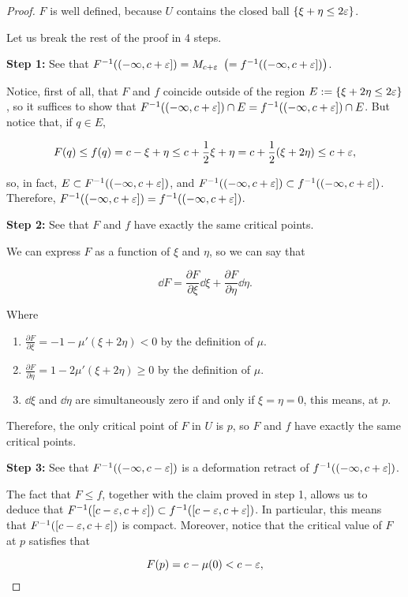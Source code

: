 \begin{proof}
$F$ is well defined, because $U$ contains the closed ball $\{ \xi + \eta \leq 2\varepsilon \}$.

Let us break the rest of the proof in 4 steps.

{\bf Step 1:} See that $F^{-1}((-\infty,c+\varepsilon]) = M_{c+\varepsilon} \ \left( = f^{-1}((-\infty,c+\varepsilon]) \right)$.

Notice, first of all, that $F$ and $f$ coincide outside of the region $E:=\{ \xi + 2\eta \leq 2\varepsilon\}$, so it suffices to show that $F^{-1}((-\infty,c+\varepsilon]) \cap E = f^{-1}((-\infty,c+\varepsilon]) \cap E$. But notice that, if $q \in E$,

$$F(q) \leq f(q) = c - \xi + \eta \leq c + \frac12 \xi + \eta = c + \frac12 (\xi + 2\eta) \leq c + \varepsilon ,$$

so, in fact, $E \subset F^{-1}((-\infty,c+\varepsilon])$, and $F^{-1}((-\infty,c+\varepsilon]) \subset f^{-1}((-\infty,c+\varepsilon])$. Therefore, $F^{-1}((-\infty,c+\varepsilon]) = f^{-1}((-\infty,c+\varepsilon])$.

{\bf Step 2:} See that $F$ and $f$ have exactly the same critical points.

We can express $F$ as a function of $\xi$ and $\eta$, so we can say that

$$\dd F = \frac{\partial F}{\partial \xi} \dd \xi + \frac{\partial F}{\partial \eta} \dd \eta .$$

Where

\begin{enumerate}
	\item $\frac{\partial F}{\partial \xi} = -1 - \mu'(\xi+2\eta) < 0$ by the definition of $\mu$.
	\item $\frac{\partial F}{\partial \eta} = 1 - 2 \mu'(\xi+2\eta) \geq 0$ by the definition of $\mu$.
	\item $\dd \xi$ and $\dd \eta$ are simultaneously zero if and only if $\xi = \eta = 0$, this means, at $p$.
\end{enumerate}

Therefore, the only critical point of $F$ in $U$ is $p$, so $F$ and $f$ have exactly the same critical points.

{\bf Step 3:} See that $F^{-1}((-\infty,c-\varepsilon])$ is a deformation retract of $f^{-1}((-\infty,c+\varepsilon])$.

The fact that $F \leq f$, together with the claim proved in step 1, allows us to deduce that $F^{-1}([c-\varepsilon,c+\varepsilon]) \subset f^{-1}([c-\varepsilon,c+\varepsilon])$. In particular, this means that $F^{-1}([c-\varepsilon,c+\varepsilon])$ is compact. Moreover, notice that the critical value of $F$ at $p$ satisfies that

$$F(p) = c - \mu(0) < c - \varepsilon ,$$


\end{proof}
